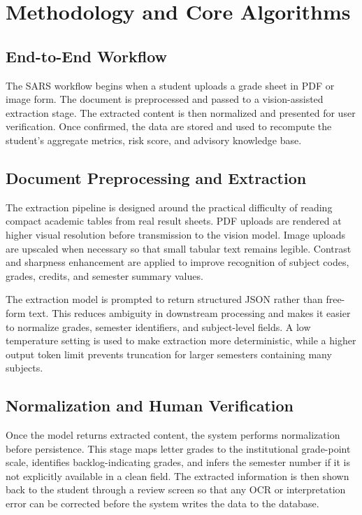 \chapter{Methodology and Core Algorithms}

\section{End-to-End Workflow}
The SARS workflow begins when a student uploads a grade sheet in PDF or image form. The document is preprocessed and passed to a vision-assisted extraction stage. The extracted content is then normalized and presented for user verification. Once confirmed, the data are stored and used to recompute the student's aggregate metrics, risk score, and advisory knowledge base.

\section{Document Preprocessing and Extraction}
The extraction pipeline is designed around the practical difficulty of reading compact academic tables from real result sheets. PDF uploads are rendered at higher visual resolution before transmission to the vision model. Image uploads are upscaled when necessary so that small tabular text remains legible. Contrast and sharpness enhancement are applied to improve recognition of subject codes, grades, credits, and semester summary values.

The extraction model is prompted to return structured JSON rather than free-form text. This reduces ambiguity in downstream processing and makes it easier to normalize grades, semester identifiers, and subject-level fields. A low temperature setting is used to make extraction more deterministic, while a higher output token limit prevents truncation for larger semesters containing many subjects.

\section{Normalization and Human Verification}
Once the model returns extracted content, the system performs normalization before persistence. This stage maps letter grades to the institutional grade-point scale, identifies backlog-indicating grades, and infers the semester number if it is not explicitly available in a clean field. The extracted information is then shown back to the student through a review screen so that any OCR or interpretation error can be corrected before the system writes the data to the database.

